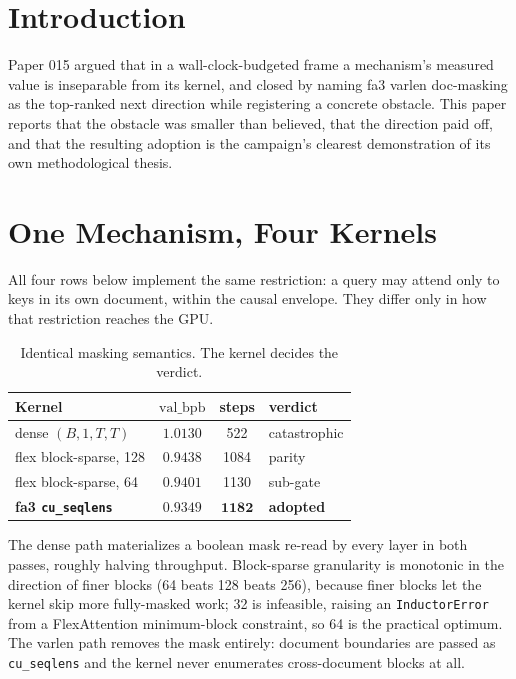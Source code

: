 \documentclass{article}
\newcommand{\valbpb}{\mathrm{val\_bpb}}
\begin{document}
\section{Introduction}
Paper 015 argued that in a wall-clock-budgeted frame a mechanism's measured value is inseparable from its kernel, and closed by naming fa3 varlen doc-masking as the top-ranked next direction while registering a concrete obstacle. This paper reports that the obstacle was smaller than believed, that the direction paid off, and that the resulting adoption is the campaign's clearest demonstration of its own methodological thesis.

\section{One Mechanism, Four Kernels}
\label{sec:four}
All four rows below implement the same restriction: a query may attend only to keys in its own document, within the causal envelope. They differ only in how that restriction reaches the GPU.

\begin{table}[t]
\caption{Identical masking semantics. The kernel decides the verdict.}
\label{tab:four}
\vskip 0.1in
\begin{center}\begin{small}\begin{tabular}{lccl}
\toprule
Kernel & $\valbpb$ & steps & verdict \\
\midrule
dense $(B,1,T,T)$ & $1.0130$ & 522 & catastrophic \\
flex block-sparse, 128 & $0.9438$ & 1084 & parity \\
flex block-sparse, 64 & $0.9401$ & 1130 & sub-gate \\
\textbf{fa3 \texttt{cu\_seqlens}} & $\mathbf{0.9349}$ & $\mathbf{1182}$ & \textbf{adopted} \\
\bottomrule
\end{tabular}\end{small}\end{center}
\vskip -0.15in
\end{table}

The dense path materializes a boolean mask re-read by every layer in both passes, roughly halving throughput. Block-sparse granularity is monotonic in the direction of finer blocks (64 beats 128 beats 256), because finer blocks let the kernel skip more fully-masked work; 32 is infeasible, raising an \texttt{InductorError} from a FlexAttention minimum-block constraint, so 64 is the practical optimum. The varlen path removes the mask entirely: document boundaries are passed as \texttt{cu\_seqlens} and the kernel never enumerates cross-document blocks at all.
\end{document}

